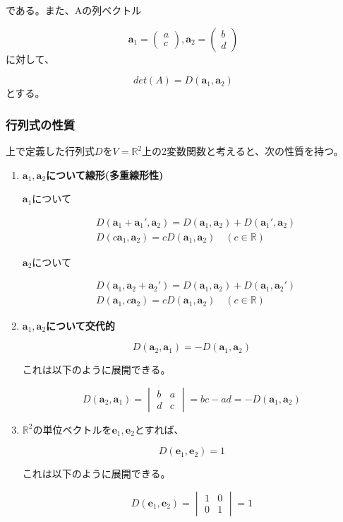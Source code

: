 \documentclass[dvipdfmx,autodetect-engine]{jsarticle}
\newcommand{\vecSpace}[1]{\mathbb{R}^{#1}}
\begin{document}
である。また、Aの列ベクトル

$$
\bm{a}_1 = \begin{pmatrix}
a \\
c
\end{pmatrix},
\bm{a}_2 = \begin{pmatrix}
b \\
d
\end{pmatrix}
$$に対して、

$$
det(A) = D(\bm{a}_1, \bm{a}_2)
$$
とする。

\subsubsection{行列式の性質}

上で定義した行列式$D$を$V = \vecSpace{2}$上の2変数関数と考えると、次の性質を持つ。

\begin{enumerate}
\renewcommand{\labelenumi}{(\arabic{enumi})}
\item {\bf $\bm{a}_1, \bm{a}_2$について線形(多重線形性)}

$\bm{a}_1$について

\begin{eqnarray*}
&D(\bm{a}_1 + \bm{a}_1', \bm{a}_2) = D(\bm{a}_1, \bm{a}_2) + D(\bm{a}_1',  \bm{a}_2) \\
&D(c\bm{a}_1, \bm{a}_2) = cD(\bm{a}_1, \bm{a}_2) \quad (c \in \mathbb{R})
\end{eqnarray*}

$\bm{a}_2$について

\begin{eqnarray*}
&D(\bm{a}_1, \bm{a}_2 + \bm{a}_2') = D(\bm{a}_1, \bm{a}_2) + D(\bm{a}_1,  \bm{a}_2') \\
&D(\bm{a}_1, c\bm{a}_2) = cD(\bm{a}_1, \bm{a}_2) \quad (c \in \mathbb{R})
\end{eqnarray*}


\item {\bf $\bm{a}_1, \bm{a}_2$について交代的}

$$
D(\bm{a}_2, \bm{a}_1) = -D(\bm{a}_1, \bm{a}_2)
$$

これは以下のように展開できる。

$$
D(\bm{a}_2, \bm{a}_1) = \begin{vmatrix}
b & a \\
d & c
\end{vmatrix} = bc - ad = -D(\bm{a}_1, \bm{a}_2)
$$

\item $\vecSpace{2}$の単位ベクトルを$\bm{e}_1, \bm{e}_2$とすれば、

$$
D(\bm{e}_1, \bm{e}_2) = 1
$$

これは以下のように展開できる。

$$
D(\bm{e}_1, \bm{e}_2) = \begin{vmatrix}
1 & 0 \\
0 & 1
\end{vmatrix} = 1
$$

\end{enumerate}
\end{document}
